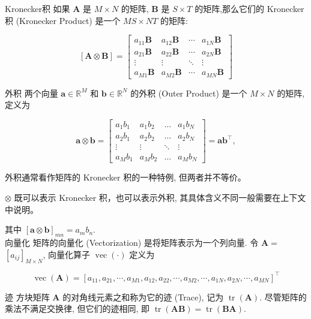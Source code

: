 \documentclass[10pt]{article}
\begin{document}
Kronecker积 如果 $\boldsymbol{A}$ 是 $M \times N$ 的矩阵, $\boldsymbol{B}$ 是 $S \times T$ 的矩阵,那么它们的 Kronecker 积 (Kronecker Product) 是一个 $M S \times N T$ 的矩阵:

\[
[\boldsymbol{A} \otimes \boldsymbol{B}]=\left[\begin{array}{cccc}
a_{11} \boldsymbol{B} & a_{12} \boldsymbol{B} & \cdots & a_{1 N} \boldsymbol{B}  \tag{A.27}\\
a_{21} \boldsymbol{B} & a_{22} \boldsymbol{B} & \cdots & a_{2 N} \boldsymbol{B} \\
\vdots & \vdots & \ddots & \vdots \\
a_{M 1} \boldsymbol{B} & a_{M 2} \boldsymbol{B} & \cdots & a_{M N} \boldsymbol{B}
\end{array}\right]
\]

外积 两个向量 $\boldsymbol{a} \in \mathbb{R}^{M}$ 和 $\boldsymbol{b} \in \mathbb{R}^{N}$ 的外积 (Outer Product) 是一个 $M \times N$ 的矩阵, 定义为

\[
\boldsymbol{a} \otimes \boldsymbol{b}=\left[\begin{array}{cccc}
a_{1} b_{1} & a_{1} b_{2} & \ldots & a_{1} b_{N}  \tag{A.28}\\
a_{2} b_{1} & a_{2} b_{2} & \ldots & a_{2} b_{N} \\
\vdots & \vdots & \ddots & \vdots \\
a_{M} b_{1} & a_{M} b_{2} & \ldots & a_{M} b_{N}
\end{array}\right]=\boldsymbol{a} \boldsymbol{b}^{\top},
\]

外积通常看作矩阵的 Kronecker 积的一种特例, 但两者并不等价。

$\otimes$ 既可以表示 Kronecker 积，也可以表示外积, 其具体含义不同一般需要在上下文中说明。

其中 $[\boldsymbol{a} \otimes \boldsymbol{b}]_{m n}=a_{m} b_{n}$.\\
向量化 矩阵的向量化 (Vectorization) 是将矩阵表示为一个列向量. 令 $\boldsymbol{A}=$ $\left[a_{i j}\right]_{M \times N}$, 向量化算子 $\operatorname{vec}(\cdot)$ 定义为

$$
\operatorname{vec}(\boldsymbol{A})=\left[a_{11}, a_{21}, \cdots, a_{M 1}, a_{12}, a_{22}, \cdots, a_{M 2}, \cdots, a_{1 N}, a_{2 N}, \cdots, a_{M N}\right]^{\top}
$$

迹 方块矩阵 $\boldsymbol{A}$ 的对角线元素之和称为它的迹 (Trace), 记为 $\operatorname{tr}(\boldsymbol{A})$. 尽管矩阵的乘法不满足交换律, 但它们的迹相同, 即 $\operatorname{tr}(\boldsymbol{A B})=\operatorname{tr}(\boldsymbol{B} \boldsymbol{A})$.
\end{document}
